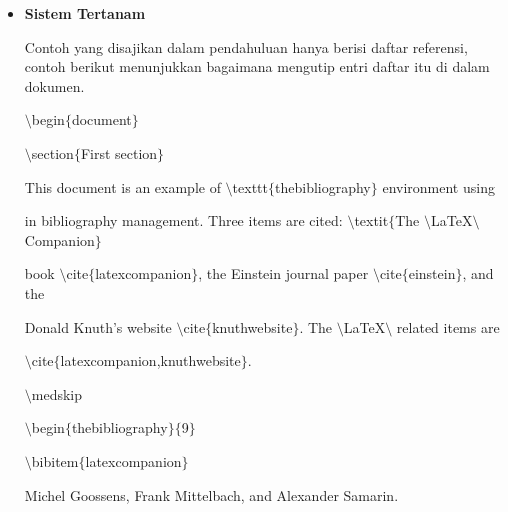 \begin{itemize}
\vspace{\baselineskip}
\vspace{12pt}
	\item {\fontsize{14pt}{14pt}\selectfont \textbf{Sistem Tertanam}}\par
\vspace{\baselineskip}
Contoh yang disajikan dalam pendahuluan hanya berisi daftar referensi, contoh berikut menunjukkan bagaimana mengutip entri daftar itu di dalam dokumen.\par

\hspace*{0.5in}$\setminus$begin$ \{ $document$ \} $ \par

\hspace*{0.5in}$\setminus$section$ \{ $First section$ \} $\par

\hspace*{0.5in}This document is an example of $\setminus$texttt$ \{ $thebibliography$ \} $ environment using \par

\hspace*{0.5in}in bibliography management. Three items are cited: $\setminus$textit$ \{ $The $\setminus$LaTeX$\setminus$ Companion$ \} $ \par

\hspace*{0.5in}book $\setminus$cite$ \{ $latexcompanion$ \} $, the Einstein journal paper $\setminus$cite$ \{ $einstein$ \} $, and the \par

\hspace*{0.5in}Donald Knuth's website $\setminus$cite$ \{ $knuthwebsite$ \} $. The $\setminus$LaTeX$\setminus$ related items are\par
\vspace{\baselineskip}
\hspace*{0.5in}$\setminus$cite$ \{ $latexcompanion,knuthwebsite$ \} $. \par

\hspace*{0.5in}$\setminus$medskip \par

\hspace*{0.5in}$\setminus$begin$ \{ $thebibliography$ \} $$ \{ $9$ \} $\par

\hspace*{0.5in}$\setminus$bibitem$ \{ $latexcompanion$ \} $ \par
\vspace{\baselineskip}
\hspace*{0.5in}Michel Goossens, Frank Mittelbach, and Alexander Samarin. \par


\end{itemize}
